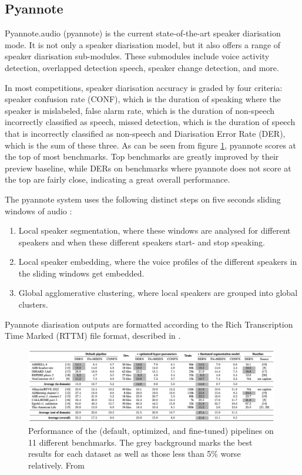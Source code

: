 \documentclass[twoside]{uva-inf-bachelor-thesis}
\begin{document}
\subsection{Pyannote}\label{sec:pyannote}
 Pyannote.audio (pyannote) is the current state-of-the-art speaker diarisation mode. It is not only a speaker diarisation model, but it also offers a range of speaker diarisation sub-modules. These submodules include voice activity detection, overlapped detection speech, speaker change detection, and more. \cite{bredin2020pyannote, bredin2023pyannote}

In most competitions, speaker diarisation accuracy is graded by four criteria: speaker confusion rate (CONF), which is the duration of speaking where the speaker is mislabeled, false alarm rate, which is the duration of non-speech incorrectly classified as speech, missed detection, which is the duration of speech that is incorrectly classified as non-speech and Diarisation Error Rate (DER), which is the sum of these three. As can be seen from figure \ref{fig:pyanres}, pyannote scores at the top of most benchmarks. Top benchmarks are greatly improved by their preview baseline, while DERs on benchmarks where pyannote does not score at the top are fairly close, indicating a great overall performance. \cite{bredin2023pyannote}


The pyannote system uses the following distinct steps on five seconds sliding windows of audio \cite{bredin2023pyannote}: 
\begin{enumerate}
    \item Local speaker segmentation, where these windows are analysed for different speakers and when these different speakers start- and stop speaking.
    \item Local speaker embedding, where the voice profiles of the different speakers in the sliding windows get embedded.
    \item Global agglomerative clustering, where local speakers are grouped into global clusters. 
\end{enumerate}

Pyannote diarisation outputs are formatted according to the Rich Transcription Time Marked (RTTM) file format, described in \cite{ryant2018first}.

\begin{figure}
    \centering
    \includegraphics[width=0.99\textwidth]{images/pyanresults2.png}
    \caption{Performance of the (default, optimized, and fine-tuned) pipelines on 11 different benchmarks. The grey background marks the best results for each dataset as well as those less than 5\% worse relatively. From \cite{bredin2023pyannote}}
    \label{fig:pyanres}
\end{figure}
\end{document}
